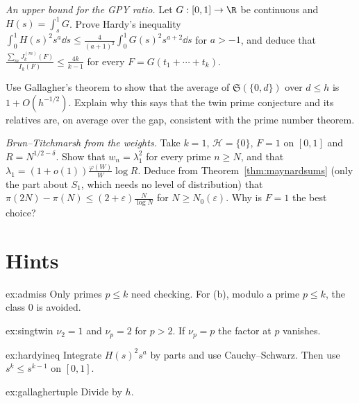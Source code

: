\begin{exercise}[$\star\star$]\label{ex:hardyineq}
\emph{An upper bound for the GPY ratio.} Let $G:[0,1]\to\R$ be continuous and $H(s)=\int_s^1G$. Prove Hardy's inequality $\int_0^1H(s)^2s^{a}\dd s\le\frac4{(a+1)^2}\int_0^1G(s)^2s^{a+2}\dd s$ for $a>-1$, and deduce that $\frac{\sum_mJ^{(m)}_k(F)}{I_k(F)}\le\frac{4k}{k-1}$ for every $F=G(t_1+\cdots+t_k)$.
\end{exercise}

\begin{exercise}[$\star\star$]\label{ex:gallaghertuple}
Use Gallagher's theorem to show that the average of $\mathfrak S(\{0,d\})$ over $d\le h$ is $1+O(h^{-1/2})$. Explain why this says that the twin prime conjecture and its relatives are, on average over the gap, consistent with the prime number theorem.
\end{exercise}

\begin{exercise}[$\star\star\star$]\label{ex:btsieve}
\emph{Brun--Titchmarsh from the weights.} Take $k=1$, $\mathcal H=\{0\}$, $F=1$ on $[0,1]$ and $R=N^{1/2-\delta}$. Show that $w_n=\lambda_1^2$ for every prime $n\ge N$, and that $\lambda_1=(1+o(1))\frac{\varphi(W)}W\log R$. Deduce from Theorem~\ref{thm:maynardsums} (only the part about $S_1$, which needs no level of distribution) that $\pi(2N)-\pi(N)\le(2+\varepsilon)\frac N{\log N}$ for $N\ge N_0(\varepsilon)$. Why is $F=1$ the best choice?
\end{exercise}

\section{Hints}

\begin{hint}{ex:admiss}
Only primes $p\le k$ need checking. For (b), modulo a prime $p\le k$, the class $0$ is avoided.
\end{hint}

\begin{hint}{ex:singtwin}
$\nu_2=1$ and $\nu_p=2$ for $p>2$. If $\nu_p=p$ the factor at $p$ vanishes.
\end{hint}

\begin{hint}{ex:hardyineq}
Integrate $H(s)^2s^a$ by parts and use Cauchy--Schwarz. Then use $s^{k}\le s^{k-1}$ on $[0,1]$.
\end{hint}

\begin{hint}{ex:gallaghertuple}
Divide by $h$.
\end{hint}

